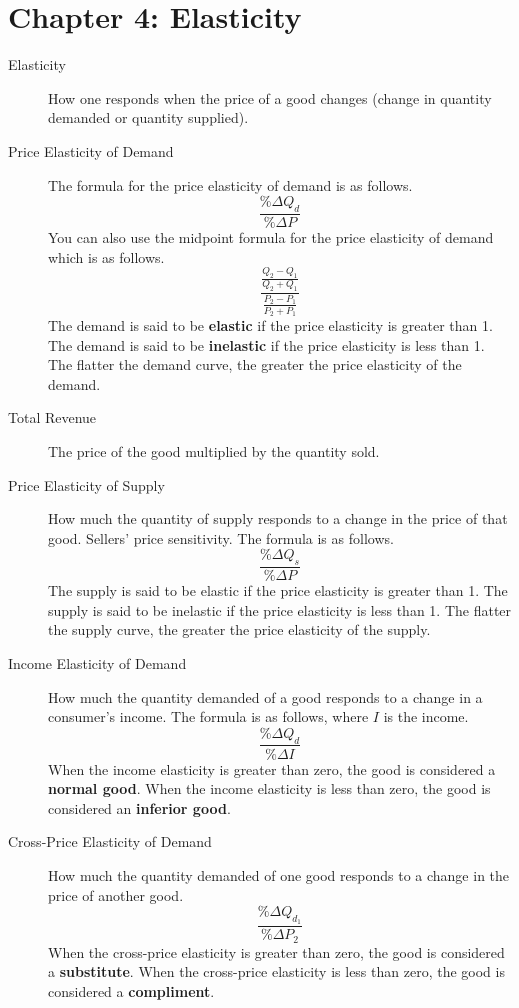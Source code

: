 \documentclass{article}
\begin{document}
\section*{Chapter 4: Elasticity}
\begin{description}
    \item[Elasticity] How one responds when the price of a good changes (change in quantity demanded or quantity supplied). 
    \item [Price Elasticity of Demand] The formula for the price elasticity of demand is as follows.
    \[\frac{\%\Delta Q_d}{\%\Delta P}\]
    You can also use the midpoint formula for the price elasticity of demand which is as follows.
    \[\frac{\frac{Q_2-Q_1}{Q_2+Q_1}}{\frac{P_2-P_1}{P_2+P_1}}\]
    The demand is said to be \textbf{elastic} if the price elasticity is greater than 1. The demand is said to be \textbf{inelastic} if the price elasticity is less than 1. The flatter the demand curve, the greater the price elasticity of the demand.
    \item [Total Revenue] The price of the good multiplied by the quantity sold. 
    \item [Price Elasticity of Supply] How much the quantity of supply responds to a change in the price of that good. Sellers' price sensitivity.  The formula is as follows.
    \[\frac{\%\Delta Q_s}{\%\Delta P}\]
    The supply is said to be elastic if the price elasticity is greater than 1. The supply is said to be inelastic if the price elasticity is less than 1. The flatter the supply curve, the greater the price elasticity of the supply.
    \item [Income Elasticity of Demand] How much the quantity demanded of a good responds to a change in a consumer's income. The formula is as follows, where \(I\) is the income.
    \[\frac{\%\Delta Q_d}{\%\Delta I}\]
    When the income elasticity is greater than zero, the good is considered a \textbf{normal good}. When the income elasticity is less than zero, the good is considered an \textbf{inferior good}.
    \item [Cross-Price Elasticity of Demand] How much the quantity demanded of one good responds to a change in the price of another good.
    \[\frac{\%\Delta Q_{d_1}}{\%\Delta P_2}\]
    When the cross-price elasticity is greater than zero, the good is considered a \textbf{substitute}. When the cross-price elasticity is less than zero, the good is considered a \textbf{compliment}.
\end{description}
\end{document}
